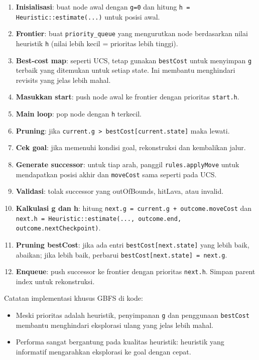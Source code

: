 \begin{enumerate}
    \item \textbf{Inisialisasi}: buat node awal dengan \texttt{g=0} dan hitung \texttt{h = Heuristic::estimate(...)} untuk posisi awal.
    \item \textbf{Frontier}: buat \texttt{priority\_queue} yang mengurutkan node berdasarkan nilai heuristik \texttt{h} (nilai lebih kecil = prioritas lebih tinggi).
    \item \textbf{Best-cost map}: seperti UCS, tetap gunakan \texttt{bestCost} untuk menyimpan \texttt{g} terbaik yang ditemukan untuk setiap state. Ini membantu menghindari revisits yang jelas lebih mahal.
    \item \textbf{Masukkan start}: push node awal ke frontier dengan prioritas \texttt{start.h}.
    \item \textbf{Main loop}: pop node dengan \texttt{h} terkecil.
    \item \textbf{Pruning}: jika \texttt{current.g > bestCost[current.state]} maka lewati.
    \item \textbf{Cek goal}: jika memenuhi kondisi goal, rekonstruksi dan kembalikan jalur.
    \item \textbf{Generate successor}: untuk tiap arah, panggil \texttt{rules.applyMove} untuk mendapatkan posisi akhir dan \texttt{moveCost} sama seperti pada UCS.
    \item \textbf{Validasi}: tolak successor yang outOfBounds, hitLava, atau invalid.
    \item \textbf{Kalkulasi g dan h}: hitung \texttt{next.g = current.g + outcome.moveCost} dan \texttt{next.h = Heuristic::estimate(..., outcome.end, outcome.nextCheckpoint)}.
    \item \textbf{Pruning bestCost}: jika ada entri \texttt{bestCost[next.state]} yang lebih baik, abaikan; jika lebih baik, perbarui \texttt{bestCost[next.state] = next.g}.
    \item \textbf{Enqueue}: push successor ke frontier dengan prioritas \texttt{next.h}. Simpan parent index untuk rekonstruksi.
\end{enumerate}

Catatan implementasi khusus GBFS di kode:
\begin{itemize}
    \item Meski prioritas adalah heuristik, penyimpanan \texttt{g} dan penggunaan \texttt{bestCost} membantu menghindari eksplorasi ulang yang jelas lebih mahal.
    \item Performa sangat bergantung pada kualitas heuristik: heuristik yang informatif mengarahkan eksplorasi ke goal dengan cepat.
\end{itemize}

